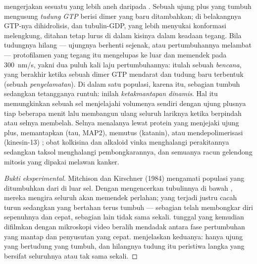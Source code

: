 \begin{definition}\label{def:b3:cytoskeleton-motility:instability}
 mengerjakan sesuatu yang lebih aneh daripada .
Sebuah ujung plus yang tumbuh mengusung \emph{tudung GTP} berisi dimer yang
baru ditambahkan; di belakangnya GTP-nya dihidrolisis, dan tubulin-GDP, yang
lebih menyukai konformasi melengkung, ditahan tetap lurus di dalam kisinya
dalam keadaan tegang. Bila tudungnya hilang --- ujungnya berhenti sejenak, atau
pertumbuhannya melambat --- protofilamen yang tegang itu mengelupas ke luar
dan  memendek pada \qty{300}{nm/s}, yakni dua puluh kali laju
pertumbuhannya: itulah sebuah \emph{bencana}, yang berakhir ketika sebuah dimer
GTP mendarat dan tudung baru terbentuk (sebuah \emph{penyelamatan}). Di dalam
satu populasi, karena itu, sebagian  tumbuh sedangkan tetangganya
runtuh: inilah \emph{ketakmantapan dinamis}. Hal itu memungkinkan sebuah sel
menjelajahi volumenya sendiri dengan ujung plusnya tiap beberapa menit lalu
membangun ulang seluruh lariknya ketika  berpindah atau selnya
membelah. Selnya menalanya lewat protein yang menjejaki ujung plus,
memantapkan (tau, MAP2), memutus (katanin), atau mendepolimerisasi
(kinesin-13) ; obat kolkisina dan alkaloid vinka menghalangi
perakitannya sedangkan taksol menghalangi pembongkarannya, dan semuanya racun
gelendong mitosis yang dipakai melawan kanker.
\end{definition}

\begin{proof}[Bukti eksperimental]
Mitchison dan Kirschner (1984) mengamati populasi  yang
ditumbuhkan dari  di luar sel. Dengan mengencerkan tubulinnya di bawah
, mereka mengira seluruh  akan memendek
perlahan; yang terjadi justru cacah  turun sedangkan yang
bertahan terus tumbuh --- sebagian telah membongkar diri sepenuhnya dan cepat,
sebagian lain tidak sama sekali.  tunggal yang kemudian difilmkan
dengan mikroskopi video beralih mendadak antara fase pertumbuhan yang mantap
dan penyusutan yang cepat.  menjelaskan keduanya: hanya ujung yang
bertudung yang tumbuh, dan hilangnya tudung itu peristiwa langka yang bersifat
seluruhnya atau tak sama sekali.
\end{proof}

